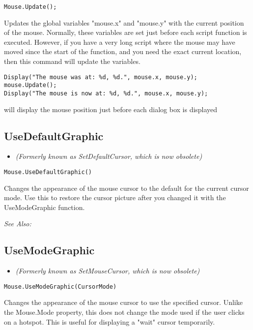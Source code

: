 \begin{verbatim}
Mouse.Update();
\end{verbatim}
Updates the global variables "mouse.x" and "mouse.y" with the current
position of the mouse. Normally, these variables are set just before each
script function is executed. However, if you have a very long script where
the mouse may have moved since the start of the function, and you need the
exact current location, then this command will update the variables.

\begin{verbatim}
Display("The mouse was at: %d, %d.", mouse.x, mouse.y);
mouse.Update();
Display("The mouse is now at: %d, %d.", mouse.x, mouse.y);
\end{verbatim}
will display the mouse position just before each dialog box is displayed


\subsection{UseDefaultGraphic}\label{Mouse.UseDefaultGraphic}%

\begin{itemize}
\item \it{(Formerly known as SetDefaultCursor, which is now obsolete)}
\end{itemize}

\begin{verbatim}
Mouse.UseDefaultGraphic()
\end{verbatim}
Changes the appearance of the mouse cursor to the default for the current
cursor mode. Use this to restore the cursor picture after you changed it
with the UseModeGraphic function.

\it{See Also:} 


\subsection{UseModeGraphic}\label{Mouse.UseModeGraphic}%

\begin{itemize}
\item \it{(Formerly known as SetMouseCursor, which is now obsolete)}
\end{itemize}

\begin{verbatim}
Mouse.UseModeGraphic(CursorMode)
\end{verbatim}
Changes the appearance of the mouse cursor to use the specified cursor. Unlike
the Mouse.Mode property, this does not change the mode used if the user
clicks on a hotspot. This is useful for displaying a "wait" cursor temporarily.

